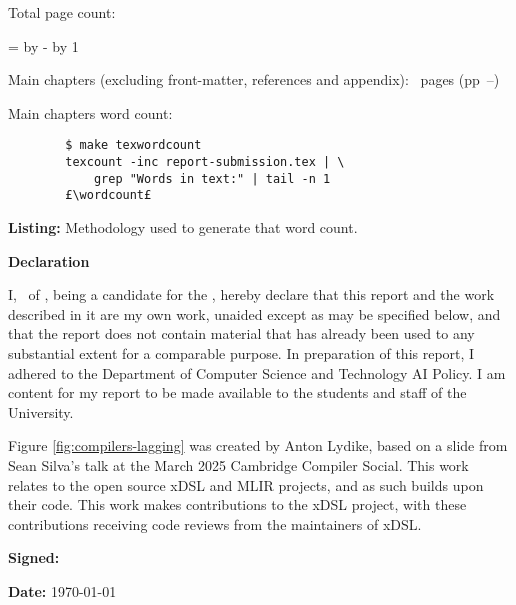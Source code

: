 \begin{sffamily}
Total page count: \pageref{LastPage}

\makeatletter
\@tempcnta=\relax%
\advance\@tempcnta by -%
\advance\@tempcnta by 1%
\xdef\contentpages{\the\@tempcnta}%
\makeatother

Main chapters (excluding front-matter, references and appendix):
\contentpages~pages
(pp~\pageref{firstcontentpage}--\pageref{lastcontentpage})

Main chapters word count: \wordcount

\vspace*{2em}
\begin{code}
    \begin{verbatim}
        $ make texwordcount
        texcount -inc report-submission.tex | \
            grep "Words in text:" | tail -n 1
        £\wordcount£
    \end{verbatim}
    \captionsetup{textfont=sf}
    \caption*{\textbf{Listing:} Methodology used to generate that word count.}
\end{code}



\vspace{\fill}
\onehalfspacing
\makeatletter
\textbf{\Huge Declaration}
\vspace{40pt}

I, \@author\ of \college, being a candidate for the \course, hereby declare that
this report and the work described in it are my own work, unaided except as may
be specified below, and that the report does not contain material that has
already been used to any substantial extent for a comparable purpose. In
preparation of this report, I adhered to the Department of Computer Science and
Technology AI Policy. I am content for my report to be made available to the
students and staff of the University.

Figure \ref{fig:compilers-lagging} was created by Anton Lydike, based on a slide from Sean Silva's talk at the March 2025 Cambridge Compiler Social. This work relates to the open source xDSL and MLIR projects, and as such builds upon their code. This work makes contributions to the xDSL project, with these contributions receiving code reviews from the maintainers of xDSL.

\bigskip
\textbf{Signed:} \@author

\bigskip
\textbf{Date:} \today
\vspace{\fill}

\makeatother

\end{sffamily}
\onehalfspacing

\fi
